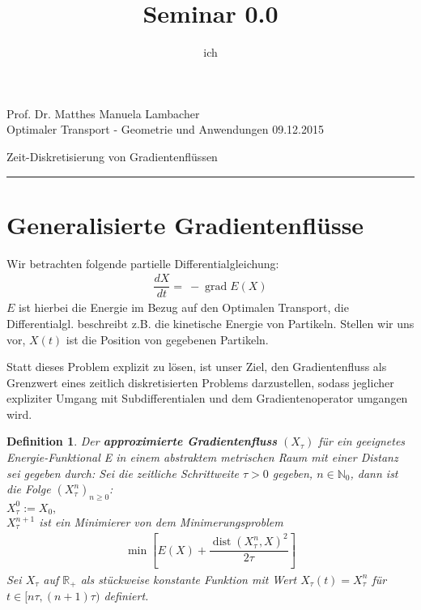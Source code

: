 \documentclass[11pt,a4paper,notitlepage]{scrreprt}
\author{ich}
\title{Seminar 0.0}
\newcommand{\RR}{\mathbb{R}}
\newcommand{\NN}{\mathbb{N}}
\newcommand{\dist}{\operatorname{dist}}
\newcommand{\grad}{\operatorname{grad}}
\newtheorem{defi}{Definition}[section]
\begin{document}
\parindent 0pt



\pagestyle{plain}



 Prof. Dr. Matthes \hfill Manuela Lambacher\\
 Optimaler Transport - Geometrie und Anwendungen \hfill 09.12.2015
 \begin{center}
  {\huge{Zeit-Diskretisierung von Gradientenflüssen}} 
 \end{center}
 
 \hrule
 
\renewcommand{\thechapter}{\arabic{section}}
\renewcommand{\thesection}{\arabic{section}}
\section{Generalisierte Gradientenflüsse}

Wir betrachten folgende partielle Differentialgleichung: 
\begin{eqnarray}
\dfrac{dX}{dt}=~-\grad E(X) \label{eq1}
\end{eqnarray}
$E$ ist hierbei die Energie im Bezug auf den Optimalen Transport, die Differentialgl. beschreibt z.B. die kinetische Energie von Partikeln. 
Stellen wir uns vor, $X(t)$ ist die Position von gegebenen Partikeln.\newline



Statt dieses Problem explizit zu lösen, ist unser Ziel, den Gradientenfluss als Grenzwert eines zeitlich diskretisierten Problems darzustellen, sodass jeglicher expliziter Umgang mit Subdifferentialen und dem Gradientenoperator umgangen wird.

\begin{defi}\label{approx}
Der \textbf{approximierte Gradientenfluss} $(X_\tau)$ für ein geeignetes Energie-Funktional E in einem abstraktem metrischen Raum mit einer Distanz sei gegeben durch:
\newline
Sei die zeitliche Schrittweite $\tau > 0$ gegeben, $n\in\NN_0$, dann ist die Folge $\left( X^n_\tau \right)_{n\geq 0}$:
\\
$X_\tau^0:=X_0,$
\\
$X_\tau^{n+1}$ ist ein Minimierer von dem Minimerungsproblem
\begin{eqnarray}
\min\left[E(X)+\dfrac{\dist(X_\tau^n,X)^2}{2\tau}\right] \label{Min}
\end{eqnarray}
Sei $X_\tau$ auf $\RR_+$ als stückweise konstante Funktion mit Wert $X_\tau(t)=X^n_\tau$ für $t\in [n\tau,(n+1)\tau)$ definiert.
\end{defi}
\end{document}
